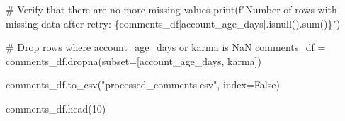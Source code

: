 \documentclass[
  12pt,
  letterpaper,
  DIV=11,
  numbers=noendperiod]{scrartcl}
\newenvironment{Shaded}{\begin{snugshade}}{\end{snugshade}}
\newcommand{\BuiltInTok}[1]{\textcolor[rgb]{0.00,0.23,0.31}{#1}}
\newcommand{\CommentTok}[1]{\textcolor[rgb]{0.37,0.37,0.37}{#1}}
\newcommand{\DecValTok}[1]{\textcolor[rgb]{0.68,0.00,0.00}{#1}}
\newcommand{\NormalTok}[1]{\textcolor[rgb]{0.00,0.23,0.31}{#1}}
\newcommand{\OperatorTok}[1]{\textcolor[rgb]{0.37,0.37,0.37}{#1}}
\newcommand{\SpecialCharTok}[1]{\textcolor[rgb]{0.37,0.37,0.37}{#1}}
\newcommand{\SpecialStringTok}[1]{\textcolor[rgb]{0.13,0.47,0.30}{#1}}
\newcommand{\StringTok}[1]{\textcolor[rgb]{0.13,0.47,0.30}{#1}}
\newcommand{\VariableTok}[1]{\textcolor[rgb]{0.07,0.07,0.07}{#1}}
\begin{document}
\begin{Shaded}
\begin{Highlighting}[]
\CommentTok{\# Verify that there are no more missing values}
\BuiltInTok{print}\NormalTok{(}\SpecialStringTok{f"Number of rows with missing data after retry: }\SpecialCharTok{\{}\NormalTok{comments\_df[}\StringTok{\textquotesingle{}account\_age\_days\textquotesingle{}}\NormalTok{]}\SpecialCharTok{.}\NormalTok{isnull()}\SpecialCharTok{.}\BuiltInTok{sum}\NormalTok{()}\SpecialCharTok{\}}\SpecialStringTok{"}\NormalTok{)}

\CommentTok{\# Drop rows where \textquotesingle{}account\_age\_days\textquotesingle{} or \textquotesingle{}karma\textquotesingle{} is NaN}
\NormalTok{comments\_df }\OperatorTok{=}\NormalTok{ comments\_df.dropna(subset}\OperatorTok{=}\NormalTok{[}\StringTok{\textquotesingle{}account\_age\_days\textquotesingle{}}\NormalTok{, }\StringTok{\textquotesingle{}karma\textquotesingle{}}\NormalTok{])}

\NormalTok{comments\_df.to\_csv(}\StringTok{"processed\_comments.csv"}\NormalTok{, index}\OperatorTok{=}\VariableTok{False}\NormalTok{)}

\NormalTok{comments\_df.head(}\DecValTok{10}\NormalTok{)}
\end{Highlighting}
\end{Shaded}
\end{document}
